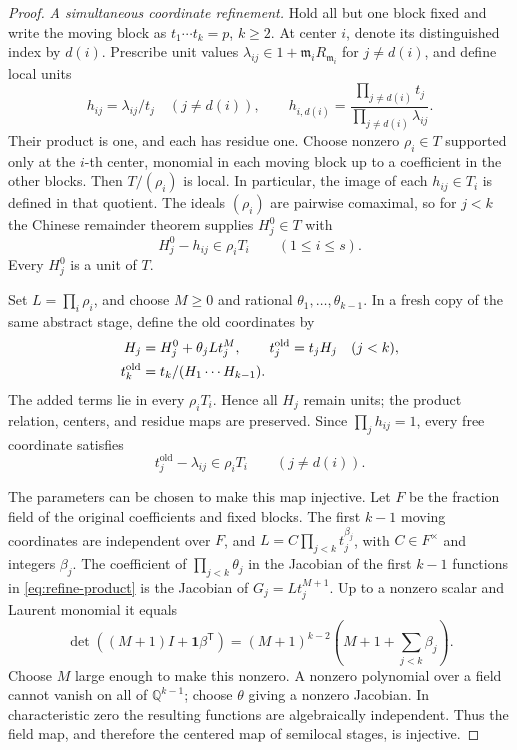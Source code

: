 \documentclass[11pt,reqno]{amsart}
\numberwithin{equation}{section}
\theoremstyle{plain}
\theoremstyle{definition}
\theoremstyle{remark}
\begin{document}
\begin{proof}
\emph{A simultaneous coordinate refinement.}
Hold all but one block fixed and write the moving block as
\(t_1\cdots t_k=p\), \(k\ge2\). At center \(i\), denote
its distinguished index by \(d(i)\). Prescribe unit values
\(\lambda_{ij}\in1+\mathfrak m_iR_{\mathfrak m_i}\) for
\(j\ne d(i)\), and define local units
\begin{equation}\label{eq:desired-ratios}
 h_{ij}=\lambda_{ij}/t_j\quad(j\ne d(i)),\qquad
 h_{i,d(i)}=
 \frac{\prod_{j\ne d(i)}t_j}{\prod_{j\ne d(i)}\lambda_{ij}}.
\end{equation}
Their product is one, and each has residue one.
Choose nonzero \(\rho_i\in T\) supported only at the \(i\)-th
center, monomial in each moving block up to a coefficient in
the other blocks. Then \(T/(\rho_i)\) is local. In particular,
the image of each \(h_{ij}\in T_i\) is defined in that quotient.
The ideals \((\rho_i)\) are pairwise comaximal, so for \(j<k\)
the Chinese remainder theorem supplies \(H_j^0\in T\) with
\[
 H_j^0-h_{ij}\in\rho_iT_i\qquad(1\le i\le s).
\]
Every \(H_j^0\) is a unit of \(T\).

Set \(L=\prod_i\rho_i\), and choose \(M\ge0\) and rational
\(\theta_1,\ldots,\theta_{k-1}\). In a fresh copy of the same
abstract stage, define the old coordinates by
\begin{align}
 H_j&=H_j^0+\theta_jLt_j^M,\qquad
 t_j^{\mathrm{old}}=t_jH_j &&(j<k),\label{eq:refine-product}\\
 t_k^{\mathrm{old}}&=t_k/(H_1\cdots H_{k-1}).\notag
\end{align}
The added terms lie in every \(\rho_iT_i\). Hence all \(H_j\)
remain units; the product relation, centers, and residue maps
are preserved. Since \(\prod_jh_{ij}=1\), every free coordinate
satisfies
\begin{equation}\label{eq:coordinate-precision}
 t_j^{\mathrm{old}}-\lambda_{ij}\in\rho_iT_i
 \qquad(j\ne d(i)).
\end{equation}

The parameters can be chosen to make this map injective.
Let \(F\) be the fraction field of the original coefficients
and fixed blocks. The first \(k-1\) moving coordinates are
independent over \(F\), and
\(L=C\prod_{j<k}t_j^{\beta_j}\), with \(C\in F^\times\)
and integers \(\beta_j\). The coefficient of
\(\prod_{j<k}\theta_j\) in the Jacobian of the first \(k-1\)
functions in \eqref{eq:refine-product} is the Jacobian of
\(G_j=Lt_j^{M+1}\). Up to a nonzero scalar and Laurent monomial
it equals
\begin{equation}\label{eq:jacobian}
 \det((M+1)I+\mathbf1\beta^{\mathsf T})
 =(M+1)^{k-2}\left(M+1+\sum_{j<k}\beta_j\right).
\end{equation}
Choose \(M\) large enough to make this nonzero. A nonzero
polynomial over a field cannot vanish on all of
\(\mathbb Q^{k-1}\); choose \(\theta\) giving a nonzero
Jacobian. In characteristic zero the resulting functions are
algebraically independent. Thus the field map, and therefore
the centered map of semilocal stages, is injective.


\end{proof}
\end{document}

